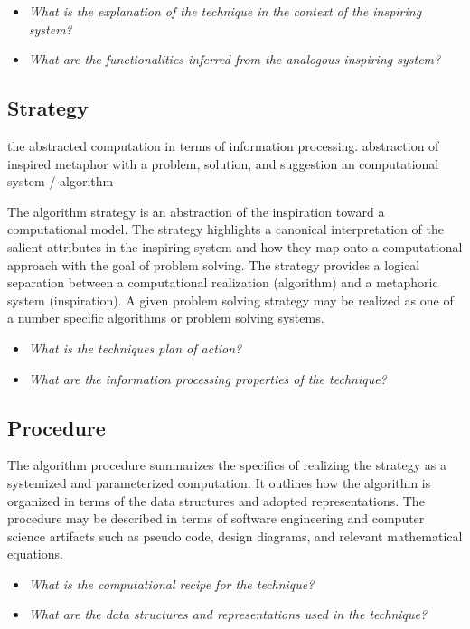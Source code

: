 \documentclass[a4paper, 11pt]{article}
\begin{document}
\begin{itemize}
	\item \emph{What is the explanation of the technique in the context of the inspiring system?}
	\item \emph{What are the functionalities inferred from the analogous inspiring system?}
\end{itemize}

\subsection{Strategy}
the abstracted computation in terms of information processing. abstraction of inspired metaphor with a problem, solution, and suggestion an computational system / algorithm

The algorithm strategy is an abstraction of the inspiration toward a computational model. The strategy highlights a canonical interpretation of the salient attributes in the inspiring system and how they map onto a computational approach with the goal of problem solving. The strategy provides a logical separation between a computational realization (algorithm) and a metaphoric system (inspiration). A given problem solving strategy may be realized as one of a number specific algorithms or problem solving systems.

\begin{itemize}
	\item \emph{What is the techniques plan of action?}
	\item \emph{What are the information processing properties of the technique?}
\end{itemize}

\subsection{Procedure}
The algorithm procedure summarizes the specifics of realizing the strategy as a systemized and parameterized computation. It outlines how the algorithm is organized in terms of the data structures and adopted representations. The procedure may be described in terms of software engineering and computer science artifacts such as pseudo code, design diagrams, and relevant mathematical equations.

\begin{itemize}
	\item \emph{What is the computational recipe for the technique?}
	\item \emph{What are the data structures and representations used in the technique?}
\end{itemize}
\end{document}
